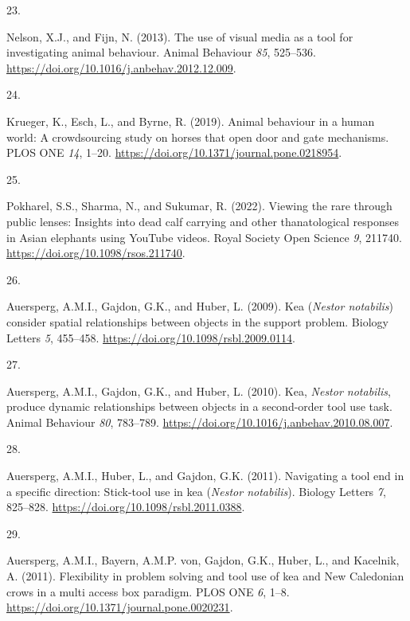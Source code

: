 \documentclass[
  man, donotrepeattitle,floatsintext]{apa6}
\newlength{\cslhangindent}
\newlength{\csllabelwidth}
\newlength{\cslentryspacingunit} %
\newenvironment{CSLReferences}[2] %
 {%
  \setlength{\parindent}{0pt}
  \ifodd #1
  \let\oldpar\par
  \def\par{\hangindent=\cslhangindent\oldpar}
  \fi
  \setlength{\parskip}{#2\cslentryspacingunit}
 }%
 {}
\newcommand{\CSLLeftMargin}[1]{\parbox[t]{\csllabelwidth}{#1}}
\newcommand{\CSLRightInline}[1]{\parbox[t]{\linewidth - \csllabelwidth}{#1}\break}
\begin{document}
\begin{CSLReferences}{0}{0}
\leavevmode{}%
\CSLLeftMargin{23. }%
\CSLRightInline{Nelson, X.J., and Fijn, N. (2013). The use of visual media as a tool for investigating animal behaviour. Animal Behaviour \emph{85}, 525--536. \url{https://doi.org/10.1016/j.anbehav.2012.12.009}.}

\leavevmode{}%
\CSLLeftMargin{24. }%
\CSLRightInline{Krueger, K., Esch, L., and Byrne, R. (2019). Animal behaviour in a human world: A crowdsourcing study on horses that open door and gate mechanisms. PLOS ONE \emph{14}, 1--20. \url{https://doi.org/10.1371/journal.pone.0218954}.}

\leavevmode{}%
\CSLLeftMargin{25. }%
\CSLRightInline{Pokharel, S.S., Sharma, N., and Sukumar, R. (2022). Viewing the rare through public lenses: Insights into dead calf carrying and other thanatological responses in {A}sian elephants using YouTube videos. Royal Society Open Science \emph{9}, 211740. \url{https://doi.org/10.1098/rsos.211740}.}

\leavevmode{}%
\CSLLeftMargin{26. }%
\CSLRightInline{Auersperg, A.M.I., Gajdon, G.K., and Huber, L. (2009). Kea (\emph{{N}estor notabilis}) consider spatial relationships between objects in the support problem. Biology Letters \emph{5}, 455--458. \url{https://doi.org/10.1098/rsbl.2009.0114}.}

\leavevmode{}%
\CSLLeftMargin{27. }%
\CSLRightInline{Auersperg, A.M.I., Gajdon, G.K., and Huber, L. (2010). Kea, \emph{{N}estor notabilis}, produce dynamic relationships between objects in a second-order tool use task. Animal Behaviour \emph{80}, 783--789. \url{https://doi.org/10.1016/j.anbehav.2010.08.007}.}

\leavevmode{}%
\CSLLeftMargin{28. }%
\CSLRightInline{Auersperg, A.M.I., Huber, L., and Gajdon, G.K. (2011). Navigating a tool end in a specific direction: Stick-tool use in kea (\emph{{N}estor notabilis}). Biology Letters \emph{7}, 825--828. \url{https://doi.org/10.1098/rsbl.2011.0388}.}

\leavevmode{}%
\CSLLeftMargin{29. }%
\CSLRightInline{Auersperg, A.M.I., Bayern, A.M.P. von, Gajdon, G.K., Huber, L., and Kacelnik, A. (2011). Flexibility in problem solving and tool use of kea and {N}ew {C}aledonian crows in a multi access box paradigm. PLOS ONE \emph{6}, 1--8. \url{https://doi.org/10.1371/journal.pone.0020231}.}


\end{CSLReferences}
\end{document}

